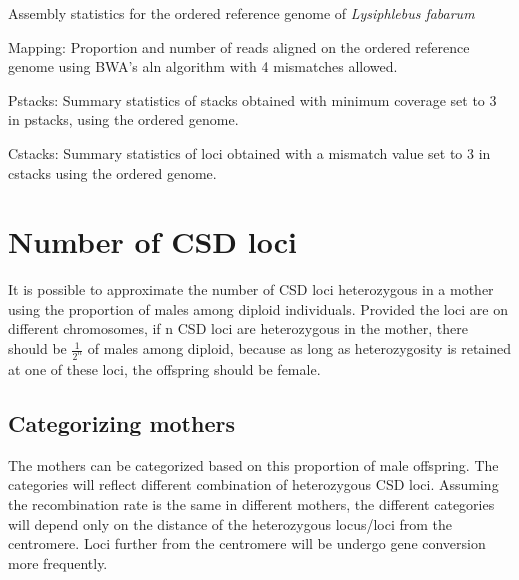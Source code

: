\documentclass[10pt,a4paper]{report}
\begin{document}
\begin{table}[h]
\caption{Assembly statistics for the ordered reference genome of \textit{Lysiphlebus fabarum}}
\label{assembly_stats_ordered}
\end{table}

\begin{table}[h]
\caption{Mapping: Proportion and number of reads aligned on the ordered reference genome using BWA's aln algorithm with 4 mismatches allowed.}
\label{mapping_stats}
\end{table}

\begin{table}
\caption{Pstacks: Summary statistics of stacks obtained with minimum coverage set to 3 in pstacks, using the ordered genome.}
\label{pstacks_ordered}
\end{table}

\begin{table}
\caption{Cstacks: Summary statistics of loci obtained with a mismatch value set to 3 in cstacks using the ordered genome.}
\label{cstacks_ordered}
\end{table}

\FloatBarrier

\chapter{Number of CSD loci}

It is possible to approximate the number of CSD loci heterozygous in a mother using the proportion of males among diploid individuals. Provided the loci are on different chromosomes, if n CSD loci are heterozygous in the mother, there should be $\frac{1}{2^n}$ of males among diploid, because as long as heterozygosity is retained at one of these loci, the offspring should be female.

\section{Categorizing mothers}

The mothers can be categorized based on this proportion of male offspring. The categories will reflect different combination of heterozygous CSD loci. Assuming the recombination rate is the same in different mothers, the different categories will depend only on the distance of the heterozygous locus/loci from the centromere. Loci further from the centromere will be undergo gene conversion more frequently.
\end{document}
